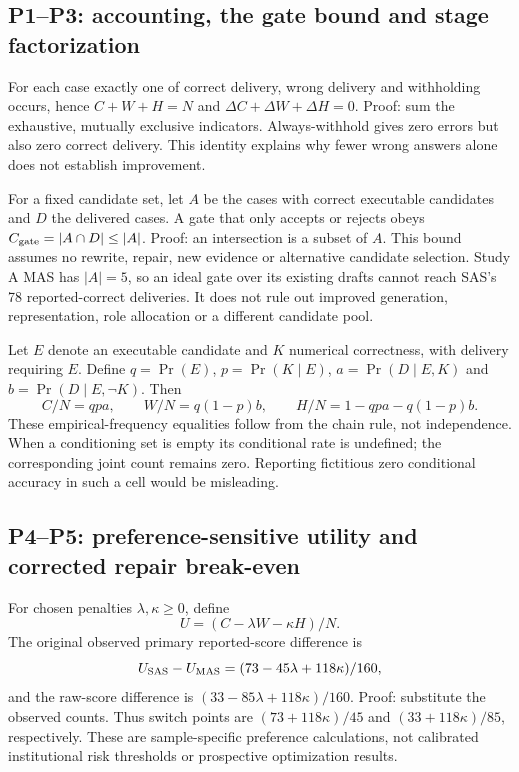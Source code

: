 \subsection{P1--P3: accounting, the gate bound and stage factorization}
For each case exactly one of correct delivery, wrong delivery and withholding occurs, hence $C+W+H=N$ and $\Delta C+\Delta W+\Delta H=0$. Proof: sum the exhaustive, mutually exclusive indicators. Always-withhold gives zero errors but also zero correct delivery. This identity explains why fewer wrong answers alone does not establish improvement.

For a fixed candidate set, let $A$ be the cases with correct executable candidates and $D$ the delivered cases. A gate that only accepts or rejects obeys $C_{\rm gate}=|A\cap D|\leq |A|$. Proof: an intersection is a subset of $A$. This bound assumes no rewrite, repair, new evidence or alternative candidate selection. Study A MAS has $|A|=5$, so an ideal gate over its existing drafts cannot reach SAS's 78 reported-correct deliveries. It does not rule out improved generation, representation, role allocation or a different candidate pool.

Let $E$ denote an executable candidate and $K$ numerical correctness, with delivery requiring $E$. Define $q=\Pr(E)$, $p=\Pr(K\mid E)$, $a=\Pr(D\mid E,K)$ and $b=\Pr(D\mid E,\neg K)$. Then
\begin{equation}\label{eq:stage}
 C/N=qpa,\qquad W/N=q(1-p)b,\qquad H/N=1-qpa-q(1-p)b.
\end{equation}
These empirical-frequency equalities follow from the chain rule, not independence. When a conditioning set is empty its conditional rate is undefined; the corresponding joint count remains zero. Reporting fictitious zero conditional accuracy in such a cell would be misleading.

\subsection{P4--P5: preference-sensitive utility and corrected repair break-even}\label{sec:utility}
For chosen penalties $\lambda,\kappa\geq0$, define
\begin{equation}
 U=(C-\lambda W-\kappa H)/N.
\end{equation}
The original observed primary reported-score difference is
\begin{equation}
 U_{\rm SAS}-U_{\rm MAS}=(73-45\lambda+118\kappa)/160,
\end{equation}
and the raw-score difference is $(33-85\lambda+118\kappa)/160$. Proof: substitute the observed counts. Thus switch points are $(73+118\kappa)/45$ and $(33+118\kappa)/85$, respectively. These are sample-specific preference calculations, not calibrated institutional risk thresholds or prospective optimization results.


